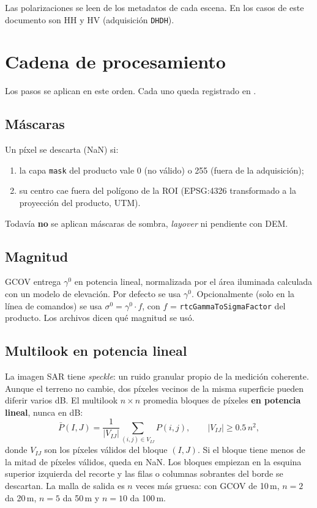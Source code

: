 \documentclass[11pt,a4paper]{article}
\begin{document}
Las polarizaciones se leen de los metadatos de cada escena. En los casos de este documento son HH
y HV (adquisición \texttt{DHDH}).

\section{Cadena de procesamiento}
\label{sec:cadena}

Los pasos se aplican en este orden. Cada uno queda registrado en .

\subsection{Máscaras}

Un píxel se descarta (NaN) si:
\begin{enumerate}
  \item la capa \texttt{mask} del producto vale 0 (no válido) o 255 (fuera de la adquisición);
  \item su centro cae fuera del polígono de la ROI (EPSG:4326 transformado a la proyección del
        producto, UTM).
\end{enumerate}
Todavía \textbf{no} se aplican máscaras de sombra, \emph{layover} ni pendiente con DEM.

\subsection{Magnitud}

GCOV entrega $\gamma^0$ en potencia lineal, normalizada por el área iluminada calculada con un
modelo de elevación. Por defecto se usa $\gamma^0$. Opcionalmente (solo en la línea de comandos)
se usa $\sigma^0 = \gamma^0 \cdot f$, con $f$ = \texttt{rtcGammaToSigmaFactor} del producto. Los
archivos dicen qué magnitud se usó.

\subsection{Multilook en potencia lineal}

La imagen SAR tiene \emph{speckle}: un ruido granular propio de la medición coherente. Aunque el
terreno no cambie, dos píxeles vecinos de la misma superficie pueden diferir varios dB. El
multilook $n\times n$ promedia bloques de píxeles \textbf{en potencia lineal}, nunca en dB:
\begin{equation}
  \bar{P}(I,J) = \frac{1}{|V_{IJ}|} \sum_{(i,j)\in V_{IJ}} P(i,j),
  \qquad
  |V_{IJ}| \ge 0.5\, n^2 ,
\end{equation}
donde $V_{IJ}$ son los píxeles válidos del bloque $(I,J)$. Si el bloque tiene menos de la mitad de
píxeles válidos, queda en NaN. Los bloques empiezan en la esquina superior izquierda del recorte y
las filas o columnas sobrantes del borde se descartan. La malla de salida es $n$ veces más gruesa:
con GCOV de 10\,m, $n=2$ da 20\,m, $n=5$ da 50\,m y $n=10$ da 100\,m.
\end{document}
